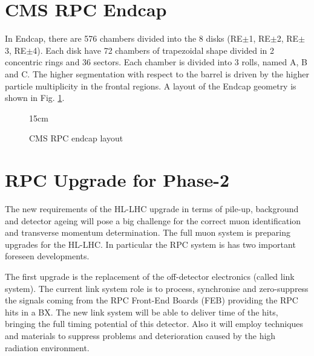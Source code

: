 \section{CMS RPC Endcap}

In Endcap, there are 576 chambers divided into the 8 disks (RE$\pm$1, RE$\pm$2, RE$\pm$3, RE$\pm$4). Each disk have 72 chambers of trapezoidal shape divided in 2 concentric rings and 36 sectors. Each chamber is divided into 3 rolls, named A, B and C. The higher segmentation with respect to the barrel is driven by the higher particle multiplicity in the frontal regions. A layout of the Endcap geometry is shown in Fig. \ref{fig:RPC_endcap_layout}.

\begin{figure}[!htm]{15cm} %
\caption{CMS RPC endcap layout}%
\label{fig:RPC_endcap_layout}
\end{figure}

\section{RPC Upgrade for Phase-2}

The new requirements of the HL-LHC upgrade in terms of pile-up,  background and detector ageing will pose a big challenge for the correct muon identification and transverse momentum determination. The full muon system is preparing upgrades for the HL-LHC. In particular the RPC system is has two important foreseen developments.

The first upgrade is the replacement of the off-detector electronics (called link system). The current link system role is to process, synchronise and zero-suppress the signals coming from the RPC Front-End Boards (FEB) providing the RPC hits in a BX. The new link system will be able to deliver time of the hits, bringing the full timing potential of this detector. Also it will employ techniques and materials to suppress problems and deterioration caused by the high radiation environment.


